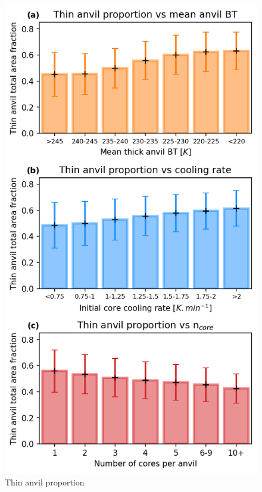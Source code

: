 \begin{figure}[tp]
    \centering
    \includegraphics[width=\textwidth]{figures/ch2_20.png}
    \caption{Thin anvil proportion}
    \label{fig:thin_anvil_proportion}
\end{figure}

